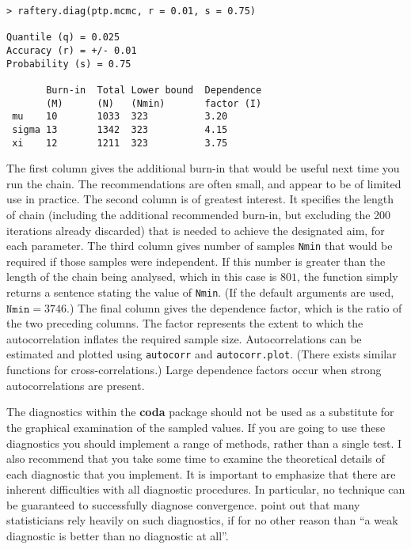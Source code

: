 \documentclass[11pt,a4paper]{article}
\begin{document}
\begin{verbatim}
> raftery.diag(ptp.mcmc, r = 0.01, s = 0.75)

Quantile (q) = 0.025
Accuracy (r) = +/- 0.01
Probability (s) = 0.75 
                                             
       Burn-in  Total Lower bound  Dependence
       (M)      (N)   (Nmin)       factor (I)
 mu    10       1033  323          3.20      
 sigma 13       1342  323          4.15      
 xi    12       1211  323          3.75  
\end{verbatim}

The first column gives the additional burn-in that would be useful next time you run the chain.
The recommendations are often small, and appear to be of limited use in practice.
The second column is of greatest interest.
It specifies the length of chain (including the additional recommended burn-in, but excluding the 200 iterations already discarded) that is needed to achieve the designated aim, for each parameter.
The third column gives number of samples \verb+Nmin+ that would be required if those samples were independent.
If this number is greater than the length of the chain being analysed, which in this case is $801$, the function simply returns a sentence stating the value of \verb+Nmin+.
(If the default arguments are used, $\texttt{Nmin}= 3746$.)
The final column gives the dependence factor, which is the ratio of the two preceding columns.
The factor represents the extent to which the autocorrelation inflates the required sample size.
Autocorrelations can be estimated and plotted using \verb+autocorr+ and \verb+autocorr.plot+.
(There exists similar functions for cross-correlations.)
Large dependence factors occur when strong autocorrelations are present.    

The diagnostics within the \textbf{coda} package should not be used as a substitute for the graphical examination of the sampled values.
If you are going to use these diagnostics you should implement a range of methods, rather than a single test.
I also recommend that you take some time to examine the theoretical details of each diagnostic that you implement.
It is important to emphasize that there are inherent difficulties with all diagnostic procedures.
In particular, no technique can be guaranteed to successfully diagnose convergence.
\citet{cowlcarl96} point out that many statisticians rely heavily on such diagnostics, if for no other reason than ``a weak diagnostic is better than no diagnostic at all''.
\end{document}
